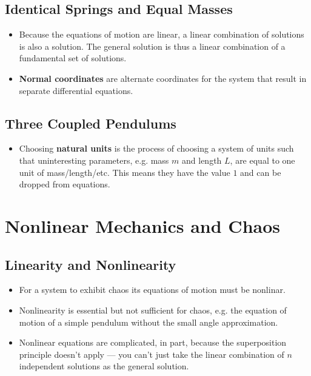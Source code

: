 \documentclass{article}
\begin{document}
\subsection{Identical Springs and Equal Masses}

\begin{itemize}
  \item Because the equations of motion are linear, a linear combination of solutions is also a solution. The general solution is thus a linear combination of a fundamental set of solutions.

  \item \textbf{Normal coordinates} are alternate coordinates for the system that result in separate differential equations.
\end{itemize}

\setcounter{subsection}{5}
\subsection{Three Coupled Pendulums}

\begin{itemize}
  \item Choosing \textbf{natural units} is the process of choosing a system of units such that uninteresting parameters, e.g. mass $m$ and length $L$, are equal to one unit of mass/length/etc. This means they have the value $1$ and can be dropped from equations.
\end{itemize}

\section{Nonlinear Mechanics and Chaos}

\subsection{Linearity and Nonlinearity}

\begin{itemize}
  \item For a system to exhibit chaos its equations of motion must be nonlinar.

  \item Nonlinearity is essential but not sufficient for chaos, e.g. the equation of motion of a simple pendulum without the small angle approximation.

  \item Nonlinear equations are complicated, in part, because the superposition principle doesn't apply — you can't just take the linear combination of $n$ independent solutions as the general solution.
\end{itemize}
\end{document}
